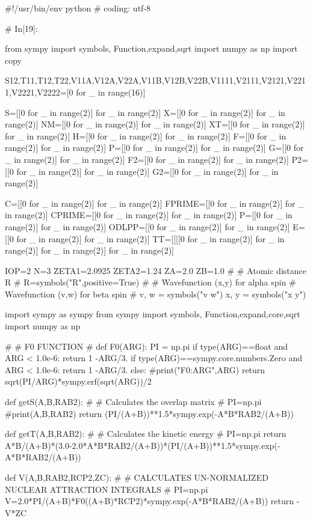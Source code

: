 #!/usr/bin/env python
# coding: utf-8

# In[19]:


from sympy import symbols, Function,expand,sqrt
import numpy as np
import copy

S12,T11,T12,T22,V11A,V12A,V22A,V11B,V12B,V22B,V1111,V2111,V2121,V2211,V2221,V2222=[0 for _ in range(16)]

S=[[0 for _ in range(2)] for _ in range(2)]
X=[[0 for _ in range(2)] for _  in range(2)]
NM=[[0 for _ in range(2)] for _  in range(2)]
XT=[[0 for _ in range(2)] for _ in  range(2)]
H=[[0 for _ in range(2)] for _ in  range(2)]
F=[[0 for _ in range(2)] for _ in  range(2)]
P=[[0 for _ in range(2)] for _  in range(2)]
G=[[0 for _ in range(2)] for _ in  range(2)]
F2=[[0 for _ in range(2)] for _ in  range(2)]
P2=[[0 for _ in range(2)] for _  in range(2)]
G2=[[0 for _ in range(2)] for _ in  range(2)]

C=[[0 for _ in range(2)] for _ in  range(2)]
FPRIME=[[0 for _ in range(2)] for _  in range(2)]
CPRIME=[[0 for _ in range(2)] for _  in range(2)]
P=[[0 for _ in range(2)] for _  in range(2)]
ODLPP=[[0 for _ in range(2)] for _  in range(2)]
E=[[0 for _ in range(2)] for _  in range(2)]
TT=[[[[0 for _ in range(2)] for _  in range(2)] for _ in range(2)] for _ in range(2)]

IOP=2
N=3
ZETA1=2.0925
ZETA2=1.24
ZA=2.0
ZB=1.0
#
#  Atomic distance R
#
R=symbols("R",positive=True)
#
#  Wavefunction (x,y) for alpha spin
#  Wavefunction (v,w) for beta spin
#
v, w = symbols("v w")
x, y = symbols("x y")

import sympy as sympy
from sympy import symbols, Function,expand,core,sqrt
import numpy as np

#
# F0 FUNCTION
#
def F0(ARG):
    PI = np.pi
    if  type(ARG)==float and ARG < 1.0e-6:
        return 1 -ARG/3.
    if  type(ARG)==sympy.core.numbers.Zero and ARG < 1.0e-6:
        return 1 -ARG/3.
    else:
        #print("F0:ARG",ARG)
        return sqrt(PI/ARG)*sympy.erf(sqrt(ARG))/2
    


def getS(A,B,RAB2):
#
# Calculates the overlap matrix
#
    PI=np.pi
    #print(A,B,RAB2)
    return (PI/(A+B))**1.5*sympy.exp(-A*B*RAB2/(A+B))

def getT(A,B,RAB2):
#
# Calculates the kinetic energy
#
    PI=np.pi
    return A*B/(A+B)*(3.0-2.0*A*B*RAB2/(A+B))*(PI/(A+B))**1.5*sympy.exp(-A*B*RAB2/(A+B))

def V(A,B,RAB2,RCP2,ZC):
#
#  CALCULATES UN-NORMALIZED NUCLEAR ATTRACTION INTEGRALS
#
    PI=np.pi
    V=2.0*PI/(A+B)*F0((A+B)*RCP2)*sympy.exp(-A*B*RAB2/(A+B))
    return -V*ZC

